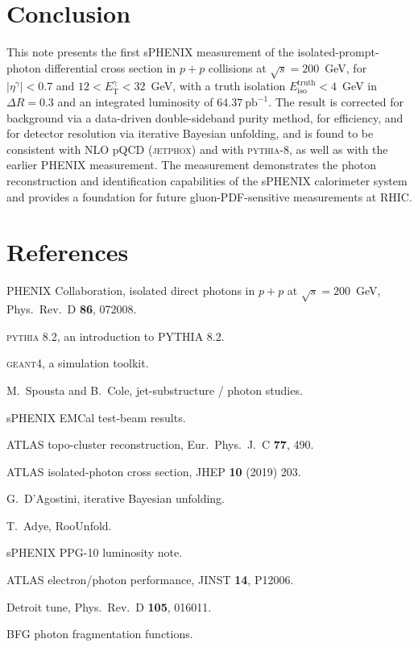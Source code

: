 \documentclass[11pt]{article}
\newcommand{\ETg}{E_{\mathrm{T}}^{\gamma}}
\newcommand{\Eiso}{E_{\mathrm{iso}}}
\newcommand{\sqrts}{\sqrt{s}}
\newcommand{\dr}{\Delta R}
\begin{document}
\section{Conclusion}

This note presents the first sPHENIX measurement of the isolated-prompt-photon
differential cross section in $p+p$ collisions at $\sqrts=200$~GeV, for
$|\eta^{\gamma}|<0.7$ and $12<\ETg<32$~GeV, with a truth isolation
$\Eiso^{\mathrm{truth}}<4$~GeV in $\dr=0.3$ and an integrated luminosity of
$64.37~\mathrm{pb}^{-1}$. The result is corrected for background via a
data-driven double-sideband purity method, for efficiency, and for detector
resolution via iterative Bayesian unfolding, and is found to be consistent with
NLO pQCD (\textsc{jetphox}) and with \textsc{pythia-8}, as well as with the
earlier PHENIX measurement. The measurement demonstrates the photon
reconstruction and identification capabilities of the sPHENIX calorimeter system
and provides a foundation for future gluon-PDF-sensitive measurements at RHIC.

\section*{References}
\begin{enumerate}[label={[\arabic*]}]
  \item PHENIX Collaboration, isolated direct photons in $p+p$ at
        $\sqrts=200$~GeV, Phys.\ Rev.\ D \textbf{86}, 072008.
  \item \textsc{pythia} 8.2, an introduction to PYTHIA 8.2.
  \item \textsc{geant4}, a simulation toolkit.
  \item M.\ Spousta and B.\ Cole, jet-substructure / photon studies.
  \item sPHENIX EMCal test-beam results.
  \item ATLAS topo-cluster reconstruction, Eur.\ Phys.\ J.\ C \textbf{77}, 490.
  \item ATLAS isolated-photon cross section, JHEP \textbf{10} (2019) 203.
  \item G.\ D'Agostini, iterative Bayesian unfolding.
  \item T.\ Adye, RooUnfold.
  \item sPHENIX PPG-10 luminosity note.
  \item ATLAS electron/photon performance, JINST \textbf{14}, P12006.
  \item Detroit tune, Phys.\ Rev.\ D \textbf{105}, 016011.
  \item BFG photon fragmentation functions.
\end{enumerate}
\end{document}

